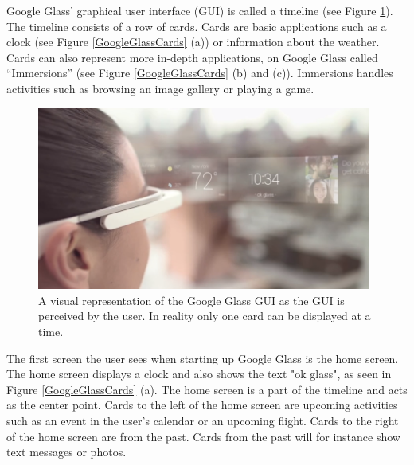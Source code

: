 Google Glass' graphical user interface (GUI) is called a timeline (see Figure \ref{GoogleGlassUI}).\cite{ImagesGoogleGlassUI} The timeline consists of a row of cards. Cards are basic applications such as a clock (see Figure \ref{GoogleGlassCards} (a)) or information about the weather. Cards can also represent more in-depth applications, on Google Glass called ``Immersions'' (see Figure \ref{GoogleGlassCards} (b) and (c)). Immersions handles activities such as browsing an image gallery or playing a game.\\

	\begin{figure}[ht!]
		\centering
		\includegraphics[width=110mm]{images/GoogleGlassUI}
		\caption{A visual representation of the Google Glass GUI as the GUI is perceived by the user. In reality only one card can be displayed at a time.\cite{ImagesGoogleGlassUI}}
		\label{GoogleGlassUI}
	\end{figure}

The first screen the user sees when starting up Google Glass is the home screen. The home screen displays a clock and also shows the text "ok glass", as seen in Figure \ref{GoogleGlassCards} (a). The home screen is a part of the timeline and acts as the center point. Cards to the left of the home screen are upcoming activities such as an event in the user's calendar or an upcoming flight. Cards to the right of the home screen are from the past. Cards from the past will for instance show text messages or photos.\\

